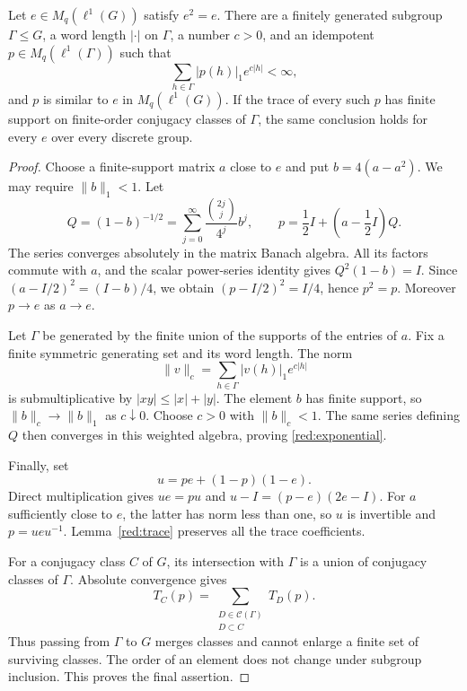 \begin{proposition}\label{red:reduction}
Let $e\in M_q(\ell^1(G))$ satisfy $e^2=e$. There are a finitely generated
subgroup $\Gamma\le G$, a word length $|\cdot|$ on $\Gamma$, a number
$c>0$, and an idempotent $p\in M_q(\ell^1(\Gamma))$ such that
\begin{equation}\label{red:exponential}
 \sum_{h\in\Gamma}|p(h)|_1e^{c|h|}<\infty,
\end{equation}
and $p$ is similar to $e$ in $M_q(\ell^1(G))$.
If the trace of every such $p$ has finite support on finite-order
conjugacy classes of $\Gamma$, the same conclusion holds for every $e$
over every discrete group.
\end{proposition}
\begin{proof}
Choose a finite-support matrix $a$ close to $e$ and put
$b=4(a-a^2)$. We may require $\|b\|_1<1$. Let
\[
 Q=(1-b)^{-1/2}=\sum_{j=0}^\infty
       \frac{\binom{2j}{j}}{4^j}b^j,
 \qquad
 p=\frac12 I+\left(a-\frac12 I\right)Q.
\]
The series converges absolutely in the matrix Banach algebra.
All its factors commute with $a$, and the scalar power-series identity
gives $Q^2(1-b)=I$. Since
$(a-I/2)^2=(I-b)/4$, we obtain $(p-I/2)^2=I/4$, hence $p^2=p$.
Moreover $p\to e$ as $a\to e$.

Let $\Gamma$ be generated by the finite union of the supports of the
entries of $a$. Fix a finite symmetric generating set and its word
length. The norm
\[
 \|v\|_c=\sum_{h\in\Gamma}|v(h)|_1e^{c|h|}
\]
is submultiplicative by $|xy|\le |x|+|y|$. The element $b$ has finite
support, so $\|b\|_c\to\|b\|_1$ as $c\downarrow0$.
Choose $c>0$ with $\|b\|_c<1$. The same series defining $Q$ then
converges in this weighted algebra, proving \eqref{red:exponential}.

Finally, set
\[
 u=pe+(1-p)(1-e).
\]
Direct multiplication gives $ue=pu$ and
$u-I=(p-e)(2e-I)$. For $a$ sufficiently close to $e$, the latter
has norm less than one, so $u$ is invertible and $p=ueu^{-1}$.
Lemma~\ref{red:trace} preserves all the trace coefficients.

For a conjugacy class $C$ of $G$, its intersection with $\Gamma$
is a union of conjugacy classes of $\Gamma$. Absolute convergence gives
\[
 T_C(p)=\sum_{\substack{D\in\mathcal C(\Gamma)\\D\subset C}}T_D(p).
\]
Thus passing from $\Gamma$ to $G$ merges classes and cannot enlarge
a finite set of surviving classes. The order of an element does not
change under subgroup inclusion. This proves the final assertion.
\end{proof}

